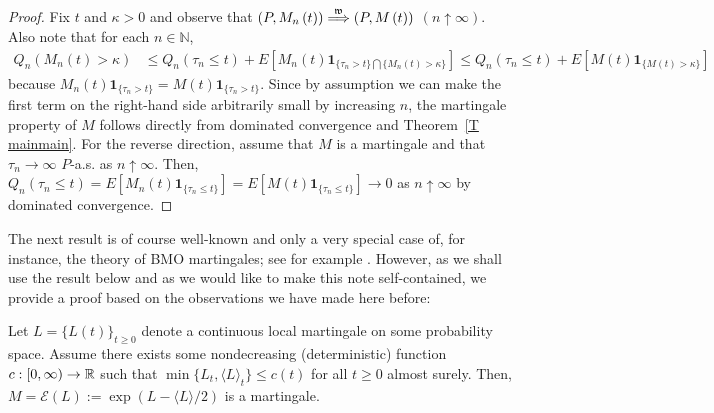 \begin{proof}
Fix $t$ and $\kappa>0$ and observe that $(P,M_{n}\left( t\right) )\overset{%
\mathfrak{w}}{\Longrightarrow}(P,M\left( t\right) )$  $(n\uparrow\infty)$.
Also note that for each $n\in \mathbb{N}$,
\begin{align*}
Q_{n}\left( M_{n}\left( t\right) >\kappa\right) &\leq Q_n\left(\tau_n\leq
t\right) + E\left[M_n(t) \mathbf{1}_{\{\tau_n > t\} \bigcap \{ M_{n}\left(
t\right) >\kappa\}}\right] \leq Q_n\left(\tau_n \leq t\right) + E\left[M(t)
\mathbf{1}_{ \{ M\left( t\right) >\kappa\}}\right]
\end{align*}
because $M_n(t) \mathbf{1}_{\{\tau_n > t\}} = M(t) \mathbf{1}_{\{\tau_n >
t\}}$. Since by assumption we can make the first term on the right-hand side
arbitrarily small by increasing $n$, the martingale property of $M$ follows
directly from dominated convergence and Theorem~\ref{T mainmain}. For the
reverse direction, assume that $M$ is a martingale and that $\tau_n
\rightarrow \infty$ $P$-a.s. as $n \uparrow \infty$. Then, $Q_n(\tau_n \leq
t) = E[M_n(t) \mathbf{1}_{\{\tau_n \leq t\}}] = E[M(t) \mathbf{1}_{\{\tau_n
\leq t\}}]\rightarrow 0 $ as $n\uparrow\infty$ by dominated convergence.
\end{proof}

The next result is of course well-known and only a very special case of, for
instance, the theory of BMO martingales; see for example %
\citet{Kazamaki_1994}. However, as we shall use the result below and as we
would like to make this note self-contained, we provide a proof based on the
observations we have made here before:

\begin{corollary}
\label{C bounded} Let $L=\{L\left( t\right) \}_{t\geq 0}$ denote a
continuous local martingale on some probability space. Assume there exists
some nondecreasing (deterministic) function $c:[0,\infty )\rightarrow {%
\mathbb{R}}$ such that $\min \{L_{t},\langle L\rangle _{t}\}\leq c(t)$ for
all $t\geq 0$ almost surely. Then, $M=\mathcal{E}(L):=\exp (L-\langle
L\rangle /2)$ is a martingale.
\end{corollary}

